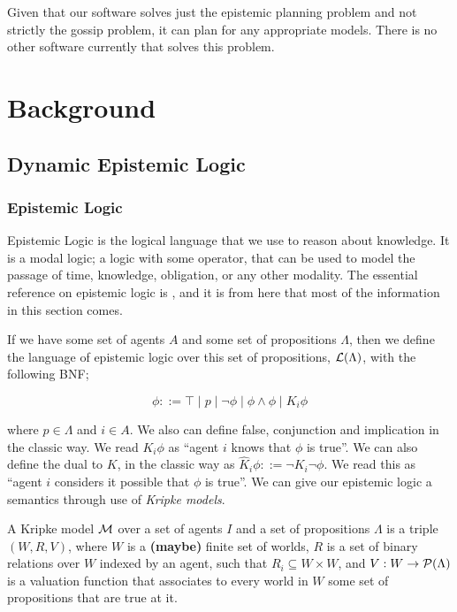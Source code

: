 \documentclass[12pt, a4paper]{article}
\begin{document}
Given that our software solves just the epistemic planning problem and not
strictly the gossip problem, it can plan for any appropriate models. There is no
other software currently that solves this problem.  

\newpage

\section{Background}

\subsection{Dynamic Epistemic Logic}

\subsubsection{Epistemic Logic}

Epistemic Logic is the logical language that we use to reason about knowledge.
It is a modal logic; a logic with some operator, that can be used to model the
passage of time, knowledge, obligation, or any other modality. The essential
reference on epistemic logic is \cite{ReasoningAboutKnowledge}, and it is from
here that most of the information in this section comes. 
  
If we have some set of agents $A$ and some set of propositions $\Lambda$, then
we define the language of epistemic logic over this set of propositions,
$\mathcal{L}(\Lambda)$, with the following BNF;


\begin{equation*}
  \phi ::= \top \mid p \mid \neg \phi \mid \phi \land \phi \mid K_i \phi
\end{equation*}

\noindent where $p \in \Lambda$ and $i \in A$. We also can define false,
conjunction and implication in the classic way. We read $K_i \phi$ as ``agent
$i$ knows that $\phi$ is true''. We can also define the dual to $K$, in the
classic way as $\widehat K_i \phi ::= \neg K_i \neg \phi$. We read this as
``agent $i$ considers it possible that $\phi$ is true''. We can give our
epistemic logic a semantics through use of \textit{Kripke models}.

\bigskip

A Kripke model $\mathcal{M}$ over a set of agents $I$ and a set of propositions
$\Lambda$ is a triple $(W, R, V)$, where $W$ is a \textbf{(maybe)} finite set of
worlds, $R$ is a set of binary relations over $W$ indexed by an agent, such that
$R_i \subseteq W \times W$, and $V : W \rightarrow \mathcal{P}(\Lambda)$ is a
valuation function that associates to every world in $W$ some set of
propositions that are true at it.
\end{document}
